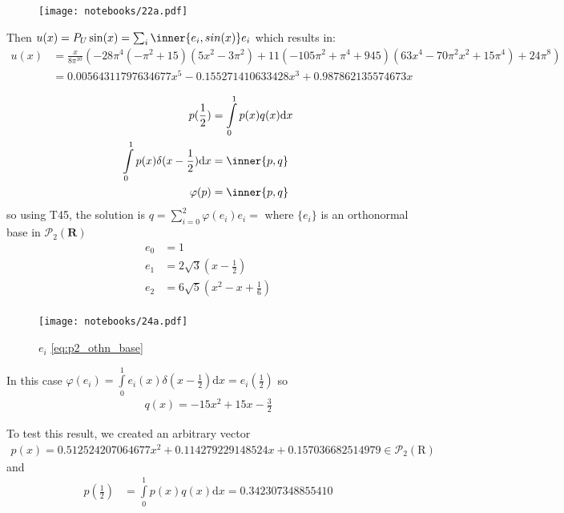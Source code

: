 \begin{figure}[h!]
\centering
\texttt{[image: notebooks/22a.pdf]} 
\end{figure}

Then $u(x)=P_U \sin(x) = \sum_i \inner{e_i,sin(x)}e_i$ which results in:
\begin{align*}
u(x) &= \frac{x}{8 \pi^{10}} \left(- 28 \pi^{4} \left(- \pi^{2} + 15\right) \left(5 x^{2} - 3 \pi^{2}\right) + 11 \left(- 105 \pi^{2} + \pi^{4} + 945\right) \left(63 x^{4} - 70 \pi^{2} x^{2} + 15 \pi^{4}\right) + 24 \pi^{8}\right) \\ 
&= 0.00564311797634677 x^{5} - 0.155271410633428 x^{3} + 0.987862135574673 x
\end{align*}


\exo{}  
\begin{align*}
p(\frac{1}{2}) &= \int\limits_0^1p(x)q(x)\mathrm{d}x \\
\int\limits_0^1p(x)\delta(x-\frac{1}{2})\mathrm{d}x &=  \inner{p,q} \\
\varphi(p) &= \inner{p,q}
\end{align*}
so using T45, the solution is $q = \sum\limits_{i=0}^2 \varphi(e_i) e_i = $ where $\{e_i\}$ is an orthonormal base in $\mathcal{P}_2(\mathbf{R})$
\begin{align}\label{eq:p2_othn_base}
e_0 &= 1 \\
e_1 &= 2 \sqrt{3} \left(x - \frac{1}{2}\right) \\
e_2 &= 6 \sqrt{5} \left(x^{2} - x + \frac{1}{6}\right) \\
\end{align}

\begin{figure}[h!]
\centering
\texttt{[image: notebooks/24a.pdf]}
\caption{$e_i$ \eqref{eq:p2_othn_base}} 
\end{figure}

In this case $\varphi(e_i) = \int\limits_0^1e_i(x)\delta(x-\frac{1}{2})\mathrm{d}x = e_i(\frac{1}{2})$ so
\begin{align*}
q(x) = - 15 x^{2} + 15 x - \frac{3}{2}
\end{align*}

To test this result, we created an arbitrary vector
\begin{align*}
p(x) = 0.512524207064677 x^{2} + 0.114279229148524 x + 0.157036682514979 \in  \mathcal{P}_2(\mathrm{R})
\end{align*}
and
\begin{align*}
p\left(\frac{1}{2}\right) &= \int\limits_0^1p(x)q(x)\mathrm{d}x = 0.342307348855410
\end{align*}

